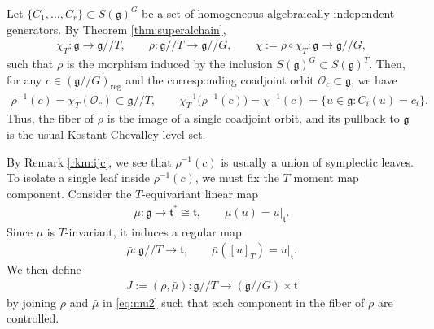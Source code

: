 \documentclass[11pt,reqno]{amsart}
\newtheorem*{theorem A}{Main Theorem A}
\newtheorem*{theorem B}{Main Theorem B}
\newtheorem*{theorem C}{Main Theorem C}
\newtheorem*{theorem D}{Main Theorem D}
\theoremstyle{definition}
\theoremstyle{plain}
\theoremstyle{conclusion}
\begin{document}
Let $\{C_1,\dots,C_r\}\subset S(\mathfrak{g})^G$ be a set of homogeneous algebraically independent generators. By Theorem \ref{thm:superalchain}, \begin{align*}
\chi_T: \mathfrak{g}\longrightarrow \mathfrak{g}//T,\qquad \rho :  \mathfrak{g}//T\longrightarrow \mathfrak{g}//G,\qquad \chi:= \rho\circ \chi_T: \mathfrak{g}\longrightarrow \mathfrak{g}//G,
\end{align*} such that $\rho$ is the morphism induced by the inclusion $S(\mathfrak{g})^G\subset S(\mathfrak{g})^T$. Then, for any $c\in(\mathfrak{g}//G)_{\mathrm{reg}}$ and the corresponding coadjoint orbit $\mathcal{O}_c\subset\mathfrak{g}$, we have \begin{align*}
\rho^{-1}(c) = \chi_T(\mathcal{O}_c) \subset \mathfrak{g}//T, \qquad \chi_T^{-1} \big(\rho^{-1}(c)\big) = \chi^{-1}(c) = \{u\in\mathfrak{g}: C_i(u)=c_i\}.
\end{align*} Thus, the fiber of $\rho$ is the image of a single coadjoint orbit, and its pullback to $\mathfrak{g}$ is the usual Kostant-Chevalley level set.

By Remark \ref{rkm:ijc}, we see that $\rho^{-1}(c)$ is usually a union of symplectic leaves. To isolate a single leaf inside $\rho^{-1}(c)$, we must fix the $T$ moment map component. %
Consider the $T$-equivariant linear map \begin{align}
 \mu:\mathfrak{g}\longrightarrow \mathfrak{t}^* \cong \mathfrak{t},\qquad \mu(u)=u \vert_{\mathfrak{t}}. \label{eq:mu1}
\end{align} Since $\mu$ is $T$-invariant, it induces a regular map \begin{align}
 \bar{\mu}:\mathfrak{g}//T \longrightarrow \mathfrak{t},\qquad \bar{\mu}([u]_T)=u \vert_{\mathfrak{t}}. \label{eq:mu2}
\end{align}   We then define   \begin{align*}
  J:=(\rho,\bar{\mu}): \mathfrak{g}//T \longrightarrow \left(\mathfrak{g}// G\right) \times \mathfrak{t}  
\end{align*} by joining $\rho$ and $\bar{\mu}$ in \eqref{eq:mu2} such that each component in the fiber of $\rho$ are controlled.
\end{document}
